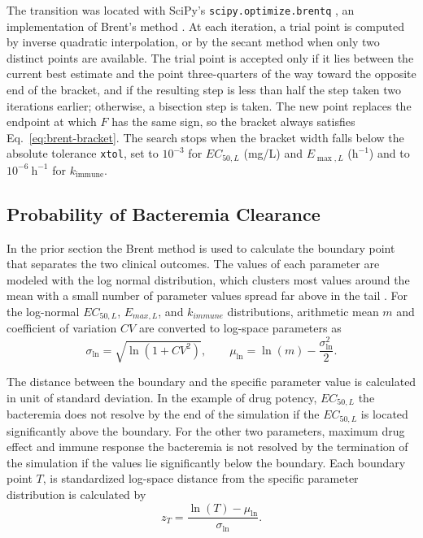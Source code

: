 \documentclass[journal]{IEEEtran}
\begin{document}
The transition was located with SciPy's \texttt{scipy.optimize.brentq}
\cite{2020SciPy-NMeth}, an implementation of Brent's method
\cite{Brent1971,brent1973}. At each iteration, a trial point is computed by
inverse quadratic interpolation, or by the secant method when only two
distinct points are available. The trial point is accepted only if it lies
between the current best estimate and the point three-quarters of the way
toward the opposite end of the bracket, and if the resulting step is less than
half the step taken two iterations earlier; otherwise, a bisection step is
taken. The new point replaces the endpoint at which $F$ has the same sign, so
the bracket always satisfies Eq.~\eqref{eq:brent-bracket}. The search stops
when the bracket width falls below the absolute tolerance \texttt{xtol}, set
to $10^{-3}$ for $EC_{50,L}$ (mg/L) and $E_{\max,L}$ ($\mathrm{h}^{-1}$) and to
$10^{-6}~\mathrm{h}^{-1}$ for $k_{\mathrm{immune}}$.

\subsection{Probability of Bacteremia Clearance}
In the prior section the Brent method is used to calculate the boundary point that separates the two clinical outcomes.
The values of each parameter are modeled with the log normal distribution, which clusters most values around
the mean with a small number of parameter values spread far above in the tail \cite{limpert2001lognormal}. For the log-normal $EC_{50,L}$, $E_{max,L}$, and $k_{immune}$ distributions, arithmetic mean $m$ and coefficient of variation $CV$ are converted to log-space
parameters as
\begin{equation}
\sigma_{\ln}=\sqrt{\ln(1+CV^2)}, \qquad
\mu_{\ln}=\ln(m)-\frac{\sigma_{\ln}^{2}}{2}.
\label{eq:lognormal-parameters}
\end{equation}

The distance between the boundary and the specific parameter value is calculated in unit of standard deviation.
In the example of drug potency, $EC_{50,L}$ the bacteremia does not resolve by the end of the simulation if the $EC_{50,L}$ is
located significantly above the boundary. For the other two parameters, maximum drug effect and immune response
the bacteremia is not resolved by the termination of the simulation if the values lie significantly below the boundary.
Each boundary point $T$, is standardized log-space distance from the
specific parameter distribution is calculated by
\begin{equation}
z_T=\frac{\ln(T)-\mu_{\ln}}{\sigma_{\ln}}.
\label{eq:lognormal-switch-z}
\end{equation}
\end{document}

